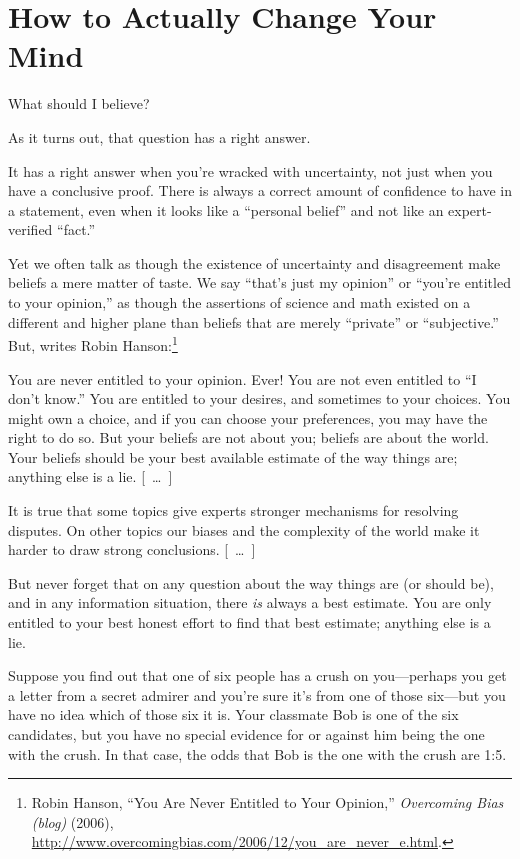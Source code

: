 \part{How to Actually Change Your Mind}




{
 What should I believe?}

{
 As it turns out, that question has a right answer.}

{
 It has a right answer when you're wracked with
uncertainty, not just when you have a conclusive proof. There is always
a correct amount of confidence to have in a statement, even when it
looks like a ``personal belief'' and
not like an expert-verified
``fact.''}

{
 Yet we often talk as though the existence of uncertainty and
disagreement make beliefs a mere matter of taste. We say
``that's just my
opinion'' or
``you're entitled to your
opinion,'' as though the assertions of science and
math existed on a different and higher plane than beliefs that are
merely ``private'' or
``subjective.'' But, writes Robin
Hanson:\footnote{Robin Hanson, ``You Are Never Entitled to Your
Opinion,'' \textit{Overcoming Bias (blog)} (2006),
\url{http://www.overcomingbias.com/2006/12/you\_are\_never\_e.html}.}}

{
 You are never entitled to your opinion. Ever! You are not even
entitled to ``I don't
know.'' You are entitled to your desires, and
sometimes to your choices. You might own a choice, and if you can
choose your preferences, you may have the right to do so. But your
beliefs are not about you; beliefs are about the world. Your beliefs
should be your best available estimate of the way things are; anything
else is a lie. [~\ldots~]}

{
 It is true that some topics give experts stronger mechanisms for
resolving disputes. On other topics our biases and the complexity of
the world make it harder to draw strong conclusions. [~\ldots~]}

{
 But never forget that on any question about the way things are (or
should be), and in any information situation, there \textit{is} always
a best estimate. You are only entitled to your best honest effort to
find that best estimate; anything else is a lie.}

{
 Suppose you find out that one of six people has a crush on
you---perhaps you get a letter from a secret admirer and
you're sure it's from one of those
six---but you have no idea which of those six it is. Your classmate Bob
is one of the six candidates, but you have no special evidence for or
against him being the one with the crush. In that case, the odds that
Bob is the one with the crush are 1:5.}

